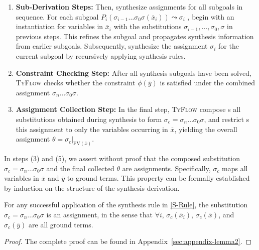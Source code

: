 \documentclass[manuscript,screen]{acmart}
\newcommand{\skhzc}[1]{#1}
\newcommand{\mvhzc}{\text{FV}}
\newcommand{\welltyped}[1]{\mathit{well\text{-}typed}\left(#1\right)}
\newcommand{\toolname}[1]{\textsc{#1}}
\newcommand{\mainname}{\toolname{TyFlow}\xspace}
\begin{document}
\begin{enumerate}
    \emergencystretch=2em \item \textbf{Sub-Derivation Steps:} Then, synthesize assignments for all subgoals in sequence. For each subgoal    {\color{revblue}$P_i(\sigma_{i-1}\ldots\sigma_0\sigma(\overline{x}_i)) \allowbreak\leadsto \sigma_i$} , begin with an instantiation for variables in $\overline{x}_i$ with the substitutions $\sigma_{i-1}, \ldots, \sigma_0, \sigma$ in previous steps.
    This refines the subgoal and propagates synthesis information from earlier subgoals. Subsequently, synthesize the assignment $\sigma_i$ for the current subgoal by recursively applying synthesis rules.

    \emergencystretch=0pt \item \textbf{Constraint Checking Step:} After all synthesis subgoals have been solved, \mainname checks whether the constraint $\phi(\overline{y})$  is satisfied under the combined assignment $\sigma_n \ldots \sigma_0 \sigma$. 

    \item \textbf{Assignment Collection Step:} In the final step, \mainname compose {\color{revblue}s}  all substitutions obtained during synthesis to form $\sigma_c = \sigma_n \ldots \sigma_0 \sigma$, and restrict {\color{revblue}s}  this assignment to only the variables occurring in $\overline{x}$, yielding the overall assignment $\theta = \sigma_c|_{\mvhzc(\overline{x})}$. 
\end{enumerate}

In steps (3) and (5), we assert without proof that the composed substitution $\sigma_c = \sigma_n \ldots \sigma_0 \sigma$ and the final collected $\theta$ are assignments. Specifically, $\sigma_c$ maps all variables in $\overline{x}$ and $\overline{y}$ to ground terms. This property can be formally established by induction on the structure of the synthesis derivation.

\begin{lemma}
\label{lemma:assignment}
For any successful application of the synthesis rule in \autoref{S-Rule}, the substitution $\sigma_c = \sigma_n \ldots \sigma_0 \sigma$ is an assignment, in the sense that $\forall i$, $\sigma_c(\skhzc{\overline{x}_i})$, $\sigma_c(\skhzc{\overline{x}})$, and $\sigma_c(\skhzc{\overline{y}})$ are all ground terms.
\end{lemma}
\begin{proof}
  The complete proof can be found in Appendix~\ref{sec:appendix-lemma2}.
\end{proof}
\end{document}

